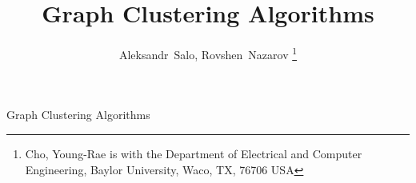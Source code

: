 \documentclass[journal]{IEEEtran}
\begin{document}
\title{Graph Clustering Algorithms}
%
%

\author{Aleksandr~Salo, Rovshen~Nazarov
\thanks{Cho, Young-Rae is with the Department
of Electrical and Computer Engineering, Baylor University, Waco,
TX, 76706 USA}%
}

% 
%



%
{Graph Clustering Algorithms}
% 




\end{document}
